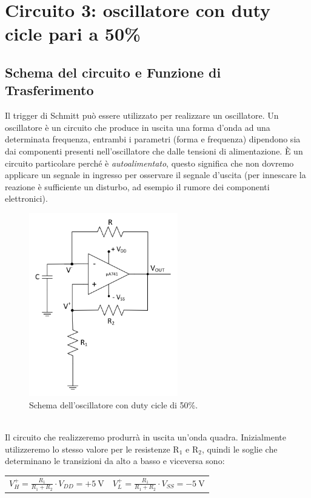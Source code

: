 \documentclass{report}
\begin{document}
\newpage\null\newpage %
\section{Circuito 3: oscillatore con duty cicle pari a 50\%}
\subsection{Schema del circuito e Funzione di Trasferimento}
Il trigger di Schmitt può essere utilizzato per realizzare un oscillatore. Un oscillatore è un circuito  che produce in uscita una forma d'onda ad una determinata frequenza, entrambi i parametri (forma e frequenza) dipendono sia dai componenti presenti nell'oscillatore che dalle tensioni di alimentazione. \`E un circuito particolare perché è \textit{autoalimentato}, questo significa che non dovremo applicare un segnale in ingresso per osservare il segnale d'uscita (per innescare la reazione è sufficiente un disturbo, ad esempio il rumore dei componenti elettronici).
\begin{figure}[h!]
	\centering
	\includegraphics[height=8cm]{immagini/schema3}
	\caption{Schema dell'oscillatore con duty cicle di 50\%.}
	\label{figura:schema3}
\end{figure}
\\Il circuito che realizzeremo produrrà in uscita un'onda quadra. Inizialmente utilizzeremo lo stesso valore per le resistenze $\mathrm{R_1}$ e $\mathrm{R_2}$, quindi le soglie che determinano le transizioni da alto a basso e viceversa sono:
\begin{table}[h!]
	\centering
	\begin{tabular}{cc}
		$\displaystyle{V_H^+=\frac{R_1}{R_1+R_2}\cdot V_{DD}=+\SI{5}{\volt}}$\;\;\;\;\;\;\;\;\;\;\;\;\;\;\;\;\;\;\;\; & $\displaystyle{V_L^+=\frac{R_1}{R_1+R_2}\cdot V_{SS}=-\SI{5}{\volt}}$\\ 
	\end{tabular}
\end{table}
\end{document}
